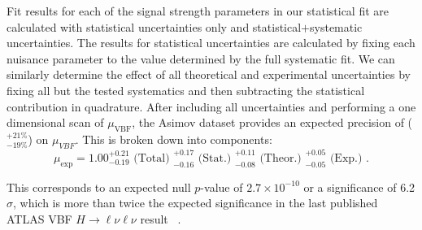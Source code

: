 Fit results for each of the signal strength parameters in our statistical fit are calculated with statistical uncertainties only and statistical$+$systematic uncertainties. The results for statistical uncertainties are calculated by fixing each nuisance parameter to the value determined by the full systematic fit. We can similarly determine the effect of all theoretical and experimental uncertainties by fixing all but the tested systematics and then subtracting the statistical contribution in quadrature. After including all uncertainties and performing a one dimensional scan of $\mu_\text{VBF}$, the Asimov dataset provides an expected precision of ($^{+21\%}_{-19\%}$) on $\mu_{VBF}$. This is broken down into components:
\begin{equation}
\mu_{\text{exp}} = 1.00 ^{+0.21}_{-0.19} \text{ (Total) } ^{+0.17}_{-0.16} \text{ (Stat.) } ^{+0.11}_{-0.08} \text{ (Theor.) } ^{+0.05}_{-0.05} \text{ (Exp.) }.
\end{equation}

This corresponds to an expected null $p$-value of $2.7\times10^{-10}$ or a significance of 6.2$\sigma$, which is more than twice the expected significance in the last published ATLAS VBF $H\rightarrow \ell\nu\ell\nu$ result ~\cite{Aaboud_2019}.   



